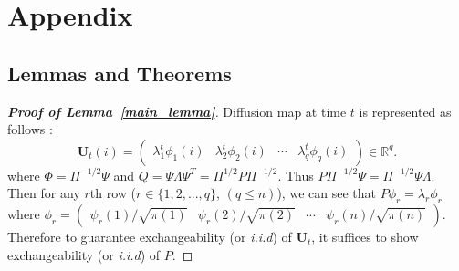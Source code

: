 \documentclass[11pt]{article}
\theoremstyle{definition}
\begin{document}
\vspace*{-0.5cm}

%
\vspace*{-0.5cm}
\section{Appendix}
\vspace*{-0.2cm}
\subsection{Lemmas and Theorems}
\label{ssec:proof}

\begin{proof}[\textbf{Proof of Lemma~\ref{main_lemma}}]
	Diffusion map at time $t$ is represented as follows :
	\begin{equation}
	\mathbf{U}_{t}(i) = \begin{pmatrix} \lambda^{t}_{1} \phi_{1}(i) & \lambda^{t}_{2} \phi_{2} (i)  & \cdots & \lambda^{t}_{q} \phi_{q}(i) \end{pmatrix} \in \mathbb{R}^{q}.
	\end{equation}
	where $\Phi = \Pi^{-1/2}\Psi$ and $Q= \Psi \Lambda \Psi^{T} = \Pi^{1/2} P \Pi^{-1/2}$. 
	Thus $P \Pi^{-1/2} \Psi = \Pi^{-1/2} \Psi \Lambda$. 
	Then for any $r$th row ($r \in \{1,2, ... , q \}$, $(q \leq n)$), we can see that $P \phi_{r} = \lambda_{r} \phi_{r}$  where $\phi_{r} = \begin{pmatrix}  \psi_{r}(1) / \sqrt{\pi(1)} &  \psi_{r}(2) /  \sqrt{\pi(2)} & \cdots & \psi_{r}(n) /  \sqrt{\pi(n)}  \end{pmatrix}$.
	Therefore to guarantee exchangeability (or \textit{i.i.d}) of $\mathbf{U}_{t}$, it suffices to show exchangeability (or \textit{i.i.d}) of $P$.
	

\end{proof}
\end{document}
